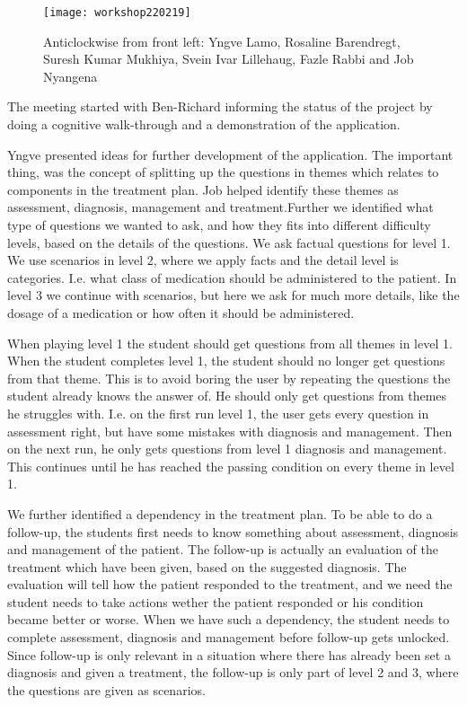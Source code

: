 \documentclass[a4paper,12pt]{book}
\begin{document}
\begin{figure}[h]
	\caption {Anticlockwise from front left: Yngve Lamo, Rosaline Barendregt, Suresh Kumar Mukhiya, Svein Ivar Lillehaug, Fazle Rabbi and Job Nyangena}
	\texttt{[image: workshop220219]}
\end{figure}

The meeting started with Ben-Richard informing the status of the project by doing a cognitive walk-through and a demonstration of the application. 

Yngve presented ideas for further development of the application. The important thing, was the concept of splitting up the questions in themes which relates to components in the treatment plan. Job helped identify these themes as assessment, diagnosis, management and treatment.Further we identified what type of questions we wanted to ask, and how they fits into different difficulty levels, based on the details of the questions. We ask factual questions for level 1. We use scenarios in level 2, where we apply facts and the detail level is categories. I.e. what class of medication should be administered to the patient. In level 3 we continue with scenarios, but here we ask for much more details, like the dosage of a medication or how often it should be administered.

When playing level 1 the student should get questions from all themes in level 1. When the student completes level 1, the student should no longer get questions from that theme. This is to avoid boring the user by repeating the questions the student already knows the answer of. He should only get questions from themes he struggles with. I.e. on the first run level 1, the user gets every question in assessment right, but have some mistakes with diagnosis and management. Then on the next run, he only gets questions from level 1 diagnosis and management. This continues until he has reached the passing condition on every theme in level 1. 

We further identified a dependency in the treatment plan. To be able to do a follow-up, the students first needs to know something about assessment, diagnosis and management of the patient. The follow-up is actually an evaluation of the treatment which have been given, based on the suggested diagnosis. The evaluation will tell how the patient responded to the treatment, and we need the student needs to take actions wether the patient responded or his condition became better or worse. When we have such a dependency, the student needs to complete assessment, diagnosis and management before follow-up gets unlocked. Since follow-up is only relevant in a situation where there has already been set a diagnosis and given a treatment, the follow-up is only part of level 2 and 3, where the questions are given as scenarios.
\end{document}

